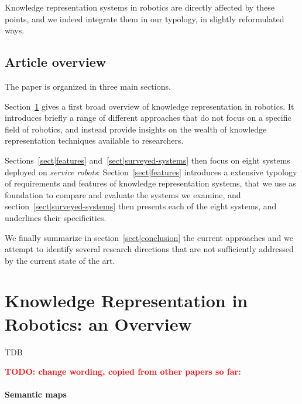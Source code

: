 \documentclass[journal]{IEEEtran}
\newcommand{\todo}[1]{\textbf{\textcolor{red}{TODO: #1}}}
\begin{document}
Knowledge representation systems in robotics are directly affected by these
points, and we indeed integrate them in our typology, in slightly reformulated
ways.

\subsection{Article overview}
\label{sect|overview}

The paper is organized in three main sections.

Section~\ref{sect|krsoverview} gives a first broad overview of knowledge
representation in robotics. It introduces briefly a range of different
approaches that do not focus on a specific field of robotics, and instead
provide insights on the wealth of knowledge representation techniques available
to researchers.

Sections~\ref{sect|features} and~\ref{sect|surveyed-systems} then focus on eight
systems deployed on \emph{service robots}: Section~\ref{sect|features}
introduces a extensive typology of requirements and features of knowledge
representation systems, that we use as foundation to compare and evaluate the
systems we examine, and section~\ref{sect|surveyed-systems} then presents each
of the eight systems, and underlines their specificities.

We finally summarize in section~\ref{sect|conclusion} the current approaches and
we attempt to identify several research directions that are not sufficiently
addressed by the current state of the art.

\section{Knowledge Representation in Robotics: an Overview}
\label{sect|krsoverview}

TDB

\todo{change wording, copied from other papers so far:}
\paragraph{Semantic maps}
\end{document}
